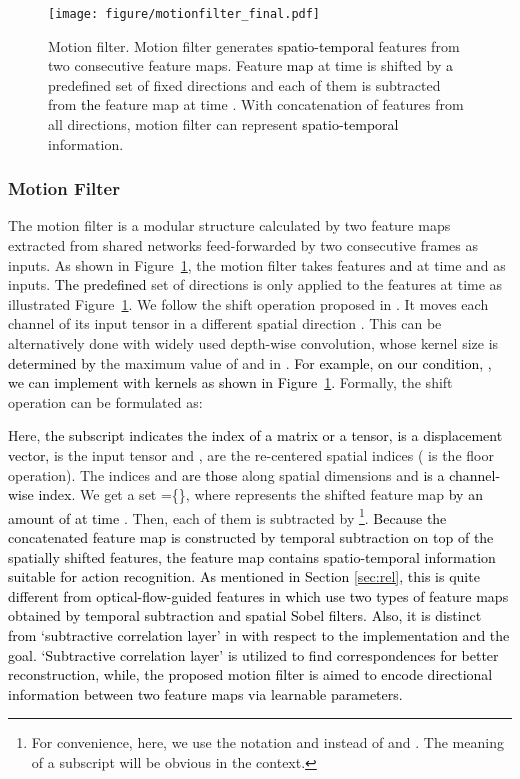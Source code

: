 \documentclass[runningheads]{llncs}
\newcommand{\nj}[1]{\textcolor{black}{#1}}
\newcommand{\mg}[1]{\textcolor{black}{#1}}
\begin{document}
\begin{figure}[t]
	\centering
    \texttt{[image: figure/motionfilter\_final.pdf]}
    \caption{Motion filter.
Motion filter generates \nj{spatio-temporal} features from two consecutive feature maps. Feature \nj{map} at time  is shifted by \nj{a} predefined set of fixed directions and each of them is subtracted from \nj{the} feature map at time . With concatenation of features from all directions, motion filter can represent \nj{spatio-temporal} information.
    }
    \label{fig:motionfilter_shifting}
\end{figure}


\subsubsection{Motion Filter}
The motion filter is a modular structure calculated by two feature maps extracted from shared networks feed-forwarded by two consecutive frames as inputs. As shown in Figure~\ref{fig:motionfilter_shifting}, the motion filter takes features  \nj{and}  at time  and  as inputs. \nj{The predefined} set of directions  is only applied to the features at time  as illustrated Figure~\ref{fig:motionfilter_shifting}. We follow the shift operation proposed in \cite{wu2017shift}. It moves each channel of its input tensor in a different spatial direction \nj{}. This can be alternatively done with widely used depth-wise convolution, whose kernel size is \nj{determined by} the maximum value of  and  in . \nj{For example, on our condition, , we can implement with  kernels as shown in Figure~\ref{fig:motionfilter_shifting}.} Formally, the shift operation can be formulated as:



Here, \nj{the subscript indicates the index of a matrix or a tensor,}
\nj{ is a displacement vector, } is the input tensor and ,  are the re-centered spatial indices ( is the floor operation). The indices  and  \nj{are those} along spatial dimensions and \nj{ is a channel-wise index}. We get a set =\{\}, where  represents the shifted feature map \nj{by an amount of  at time} . Then, each of them is subtracted by \footnote{For convenience, here, we use the notation  and  instead of  and . The meaning of a subscript will be obvious in the context.}. 
\nj{Because the concatenated feature map is constructed by temporal subtraction on top of the spatially shifted features, the feature map contains spatio-temporal information suitable for action recognition. As mentioned in Section \ref{sec:rel}, this is quite different from optical-flow-guided features in \cite{DBLP:journals/corr/abs-1711-11152} which use two types of feature maps obtained by  temporal subtraction and spatial Sobel filters.} \mg{Also, it is distinct from `subtractive correlation layer' in \cite{dosovitskiy2015flownet} with respect to the implementation and the goal. `Subtractive correlation layer' is utilized to find correspondences for better reconstruction, while, the proposed motion filter is aimed to encode directional information between two feature maps via learnable parameters.}
\end{document}
